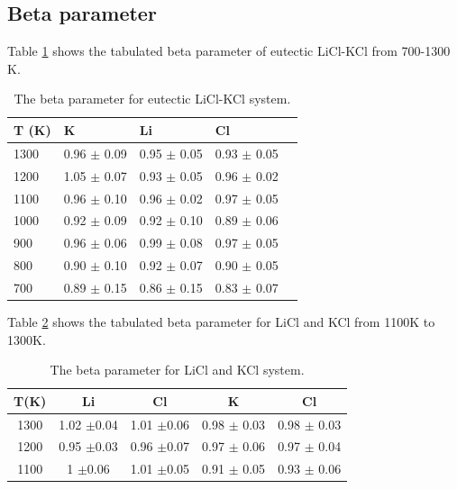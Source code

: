 \documentclass[review]{elsarticle}
\begin{document}
\subsection{Beta parameter}
Table \ref{table:licl-kcl-beta} shows the tabulated beta parameter of eutectic LiCl-KCl from 700-1300 K.  
\begin{table}[h!]
\centering
\caption{The beta parameter for eutectic LiCl-KCl system. }
\begin{tabular}{lllll}
\hline
T (K) & K           & Li          & Cl          &  \\
\hline
1300            & 0.96 $\pm$ 0.09 & 0.95 $\pm$ 0.05 & 0.93 $\pm$ 0.05 &  \\
1200            & 1.05 $\pm$ 0.07 & 0.93 $\pm$ 0.05 & 0.96 $\pm$ 0.02 &  \\
1100            & 0.96 $\pm$ 0.10  & 0.96 $\pm$ 0.02 & 0.97 $\pm$ 0.05 &  \\
1000            & 0.92 $\pm$ 0.09 & 0.92 $\pm$ 0.10  & 0.89 $\pm$ 0.06 &  \\
900             & 0.96 $\pm$ 0.06 & 0.99 $\pm$ 0.08 & 0.97 $\pm$ 0.05 &  \\
800             & 0.90 $\pm$ 0.10   & 0.92 $\pm$ 0.07 & 0.90 $\pm$ 0.05  &  \\
700             & 0.89 $\pm$ 0.15 & 0.86 $\pm$ 0.15 & 0.83 $\pm$ 0.07  & \\
\hline
\end{tabular}
\label{table:licl-kcl-beta}
\end{table}
\FloatBarrier

Table \ref{table:licl and kcl-beta} shows the tabulated beta parameter for LiCl and KCl from 1100K to 1300K.
\begin{table}[h!]
\centering
\caption{The beta parameter for LiCl and KCl system. }
\begin{tabular}{|c|cc|cc|}
\hline
T(K) & Li         & Cl         & K           & Cl          \\
\hline
1300 & 1.02 $\pm$0.04 & 1.01 $\pm$0.06 & 0.98 $\pm$ 0.03 & 0.98 $\pm$ 0.03 \\
1200 & 0.95 $\pm$0.03 & 0.96 $\pm$0.07 & 0.97 $\pm$ 0.06 & 0.97 $\pm$ 0.04 \\
1100 & 1 $\pm$0.06    & 1.01 $\pm$0.05 & 0.91 $\pm$ 0.05 & 0.93 $\pm$ 0.06 \\
\hline
\end{tabular}
\label{table:licl and kcl-beta}
\end{table}
\FloatBarrier
\end{document}

